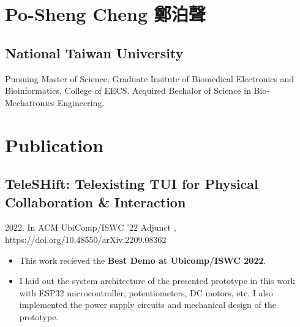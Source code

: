\documentclass[12pt]{article}
\begin{document}
    \section*{Po-Sheng Cheng 鄭泊聲} 
    \subsection*{National Taiwan University}
    {\sffamily
    Pursuing Master of Science, Graduate Insitute of Biomedical Electronics and Bioinformatics, College of EECS. \newline
    Acquired Bechalor of Science in Bio-Mechatronics Engineering.
    }
    \section*{Publication}
        \subsection*{TeleSHift: Telexisting TUI for Physical Collaboration \& Interaction}
        {\sffamily
        {\footnotesize 2022. In ACM UbiComp/ISWC '22 Adjunct%
        , https://doi.org/10.48550/arXiv.2209.08362}
        \begin{itemize}
            \item This work recieved the \textbf{Best Demo at Ubicomp/ISWC 2022}.
            \item I laid out the system architecture of the presented prototype in this work with ESP32 microcontroller, potentiometers, DC motors, etc. I also implemented the power supply circuits and mechanical design of the prototype.
        \end{itemize}
        }
\end{document}
